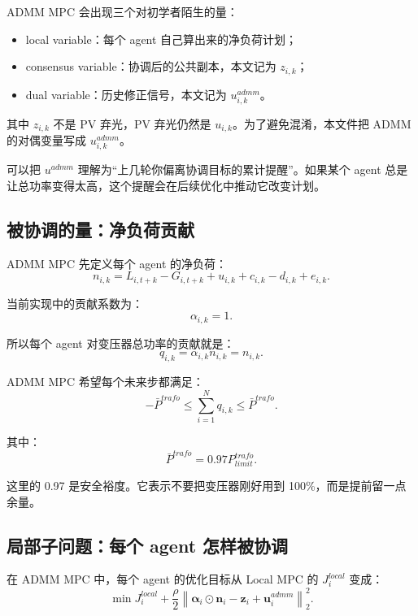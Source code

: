 \documentclass[UTF8,zihao=-4]{ctexart}
\begin{document}
ADMM MPC 会出现三个对初学者陌生的量：
\begin{itemize}
  \item local variable：每个 agent 自己算出来的净负荷计划；
  \item consensus variable：协调后的公共副本，本文记为 $z_{i,k}$；
  \item dual variable：历史修正信号，本文记为 $u^{admm}_{i,k}$。
\end{itemize}

其中 $z_{i,k}$ 不是 PV 弃光，PV 弃光仍然是 $u_{i,k}$。为了避免混淆，本文件把 ADMM 的对偶变量写成 $u^{admm}_{i,k}$。

可以把 $u^{admm}$ 理解为“上几轮你偏离协调目标的累计提醒”。如果某个 agent 总是让总功率变得太高，这个提醒会在后续优化中推动它改变计划。

\subsection{被协调的量：净负荷贡献}

ADMM MPC 先定义每个 agent 的净负荷：
\begin{equation}
n_{i,k}
=
L_{i,t+k}-G_{i,t+k}+u_{i,k}+c_{i,k}-d_{i,k}+e_{i,k}.
\end{equation}

当前实现中的贡献系数为：
\begin{equation}
\alpha_{i,k}=1.
\end{equation}

所以每个 agent 对变压器总功率的贡献就是：
\begin{equation}
q_{i,k}=\alpha_{i,k}n_{i,k}=n_{i,k}.
\end{equation}

ADMM MPC 希望每个未来步都满足：
\begin{equation}
-\bar P^{trafo}
\le
\sum_{i=1}^{N} q_{i,k}
\le
\bar P^{trafo}.
\end{equation}

其中：
\begin{equation}
\bar P^{trafo}=0.97P^{trafo}_{limit}.
\end{equation}

这里的 0.97 是安全裕度。它表示不要把变压器刚好用到 100\%，而是提前留一点余量。

\subsection{局部子问题：每个 agent 怎样被协调}

在 ADMM MPC 中，每个 agent 的优化目标从 Local MPC 的 $J_i^{local}$ 变成：
\begin{equation}
\min
J_i^{local}
+
\frac{\rho}{2}
\left\|
\bm{\alpha}_i\odot\bm{n}_i-\bm{z}_i+\bm{u}^{admm}_i
\right\|_2^2.
\end{equation}
\end{document}
